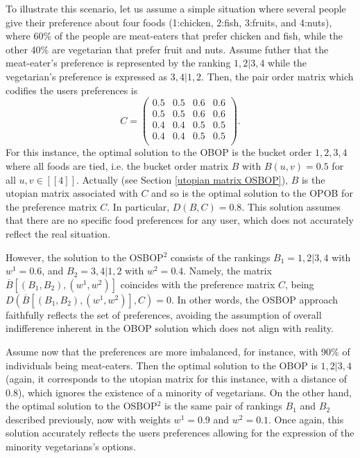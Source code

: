 \documentclass[preprint,12pt]{article}
\theoremstyle{definition}
\theoremstyle{remark}
\theoremstyle{example} %
\begin{document}
 To illustrate this scenario, let us assume a simple situation where several people give their preference about four foods (1:chicken, 2:fish, 3:fruits, and 4:nuts), where 60\% of the people are meat-eaters that prefer chicken and fish, while the other 40\% are vegetarian that prefer fruit and nuts. Assume futher that the meat-eater's preference is represented by the ranking $1,2|3,4$  while the vegetarian's preference  is expressed as $3,4|1,2$. 
Then, the pair order matrix which codifies the users preferences is
\[
C=\left(
  \begin{array}{cccc}
0.5     & 0.5  &  0.6 & 0.6 \\
0.5     & 0.5 &  0.6 & 0.6  \\
0.4     & 0.4  &  0.5 & 0.5     \\
0.4     & 0.4  &  0.5 & 0.5     \\
  \end{array}
\right).
\]
 For this instance, the optimal solution to the OBOP  is the bucket order $1,2,3,4$ where all foods are tied, i.e. the bucket order matrix $B$ with $B(u,v)=0.5$ for all $u,v\in [[4]]$. Actually (see Section \ref{utopian matrix OSBOP}), $B$ is the utopian matrix associated with $C$ and so  is the optimal solution to the OPOB  for the preference matrix $C$. In particular, $D(B,C)=0.8$. This solution assumes that there are no specific food preferences for any user, which does not accurately reflect the real situation.
 

 However, the solution to the OSBOP$^2$ consists of the rankings $B_1=1,2|3,4$ with 
 $w^1=0.6$, and $B_2=3,4|1,2$ with $w^2=0.4$.  Namely, the matrix $\overline{B}[(B_1,B_2),(w^1,w^2)]$ coincides with the preference matrix $C$, being $D(\overline{B}[(B_1,B_2),(w^1,w^2)], C)=0$. In other words, the OSBOP approach faithfully reflects the set of preferences, avoiding the assumption of overall indifference inherent in the OBOP solution which does not align with reality.

 
 
Assume now that the preferences are more imbalanced, for instance, with 90\% of individuals being meat-eaters. Then the optimal solution to the OBOP is $1,2|3,4$  (again, it corresponds to the utopian matrix for this instance, with a distance of 0.8), which ignores the existence of a minority of vegetarians. 
On the other hand, the optimal solution to the OSBOP$^2$ is the same pair of rankings $B_1$ and $B_2$ described previously, now with weights $w^1=0.9$  and $w^2=0.1$. Once again, this solution accurately reflects the users preferences allowing for the expression of the minority vegetarians’s options.
\end{document}
